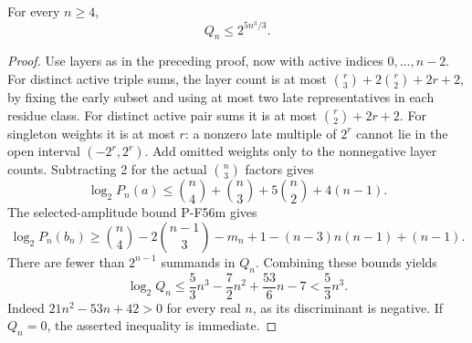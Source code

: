 \begin{lemma}
For every $n\ge4$,
\[
                             Q_n\le2^{5n^3/3}.
 \tag{PNEW-mass}
\]
\end{lemma}
\begin{proof}
Use layers as in the preceding proof, now with active indices
$0,\ldots,n-2$.  For distinct active triple sums, the layer
count is at most $\binom r3+2\binom r2+2r+2$, by fixing the
early subset and using at most two late representatives in each
residue class.  For distinct active pair sums it is at most
$\binom r2+2r+2$.  For singleton weights it is at most $r$:
a nonzero late multiple of $2^r$ cannot lie in the open interval
$(-2^r,2^r)$.  Add omitted weights only to the nonnegative layer
counts.  Subtracting 2 for the actual $\binom n3$ factors gives
\[
 \log_2P_n(a)\le\binom n4+\binom n3+5\binom n2+4(n-1).
\]
The selected-amplitude bound P-F56m gives
\[
 \log_2P_n(b_n)\ge
 \binom n4-2\binom{n-1}{3}-m_n+1-(n-3)n(n-1)+(n-1).
\]
There are fewer than $2^{n-1}$ summands in $Q_n$.  Combining
these bounds yields
\[
 \log_2Q_n\le\frac53n^3-\frac72n^2+\frac{53}{6}n-7
                         <\frac53n^3.
\]
Indeed $21n^2-53n+42>0$ for every real $n$, as its discriminant
is negative.  If $Q_n=0$, the asserted inequality is immediate.
\end{proof}

